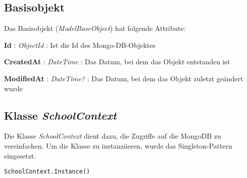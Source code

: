 \subsection{Basisobjekt}
Das Basisobjekt (\textit{ModelBaseObject}) hat folgende Attribute:

\textbf{Id} : \textit{ObjectId} : Ist die Id des Mongo-DB-Objektes

\textbf{CreatedAt} : \textit{DateTime} : Das Datum, bei dem das Objekt entstanden ist

\textbf{ModifiedAt} : \textit{DateTime?} : Das Datum, bei dem das Objekt zuletzt ge\"andert wurde

\subsection{Klasse \textit{SchoolContext}}
\label{sec:Objekte_Klasse_SchoolContext}
Die Klasse \textit{SchoolContext} dient dazu, die Zugriffe auf die MongoDB zu vereinfachen. Um die Klasse zu instanziieren, wurde das Singleton-Pattern eingesetzt.

\lstset{style=sharpc}
\begin{lstlisting}
SchoolContext.Instance()
\end{lstlisting}